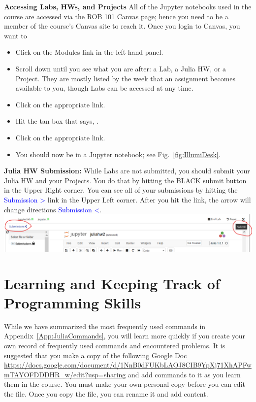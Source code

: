 \textbf{Accessing Labs, HWs, and Projects} All of the Jupyter notebooks used in the course are accessed via the ROB 101 Canvas page; hence you need to be a member of the course's Canvas site to reach it. Once you login to Canvas, you want to 
\begin{itemize}
    \item Click on the Modules link in the left hand panel.
    \item Scroll down until you see what you are after: a Lab, a Julia HW, or a Project. They are mostly listed by the week that an assignment becomes available to you, though Labs can be accessed at any time.
    \item Click on the appropriate link.
    \item Hit the tan box that says, \colorbox{Tan}{}.
    \item Click on the appropriate link.
    \item You should now be in a Jupyter notebook; see Fig.~\ref{fig:IllumiDesk}.
\end{itemize}

\textbf{Julia HW Submission:} While Labs are not submitted, you should submit your Julia HW and your Projects. You do that by hitting the BLACK submit button in the Upper Right corner. You can see all of your submissions by hitting the \textcolor{blue}{Submission >} link in the Upper Left corner. After you hit the link, the arrow will change directions \textcolor{blue}{Submission <}. \\



\includegraphics[width=0.9\columnwidth]{graphics/Chap00/Submit.png}%


\section{Learning and Keeping Track of Programming Skills}
\label{sec:GoogleDoc4Commands}


While we have summarized the most frequently used commands in Appendix~\ref{App:JuliaCommands}, you will learn more quickly if you create your own record of frequently used commands and encountered problems. It is suggested that you make a copy of the following Google Doc \url{https://docs.google.com/document/d/1NnB0dFUKbLAOJ8CIB9YpXj71XhAPFwmTAYOFDDDHR_w/edit?usp=sharing} and add commands to it as you learn them in the course. You must make your own personal copy before you can edit the file. Once you copy the file, you can rename it and add content.\\


